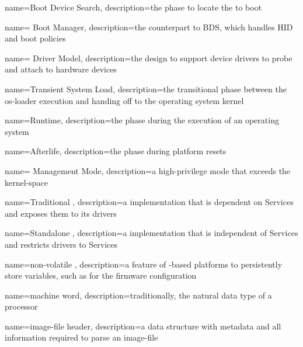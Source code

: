 {
  name={Boot Device Search},
  description={the  phase to locate the  to boot}
}

{
  name={ Boot Manager},
  description={the  counterpart to \gls{BDS}, which handles \gls{HID} and boot policies}
}

{
  name={ Driver Model},
  description={the  design to support device drivers to probe and attach to hardware devices}
}

{
  name={Transient System Load},
  description={the  transitional phase between the \gls{os-loader} execution and handing off to the operating system kernel}
}

{
  name={Runtime},
  description={the  phase during the execution of an operating system}
}

{
  name={Afterlife},
  description={the  phase during platform resets}
}

{
  name={ Management Mode},
  description={a high-privilege  mode that exceeds the \gls{kernel-space}}
}

{
  name={Traditional },
  description={a  implementation that is dependent on  Services and exposes them to its drivers}
}

{
  name={Standalone },
  description={a  implementation that is independent of  Services and restricts drivers to  Services}
}

{
  name={non-volatile },
  description={a feature of -based platforms to persistently store variables, such as for the \gls{firmware} configuration}
}

{
  name={machine word},
  description={traditionally, the natural data type of a processor}
}

{
  name={\gls{image-file} header},
  description={a data structure with metadata and all information required to parse an \gls{image-file}}
}

